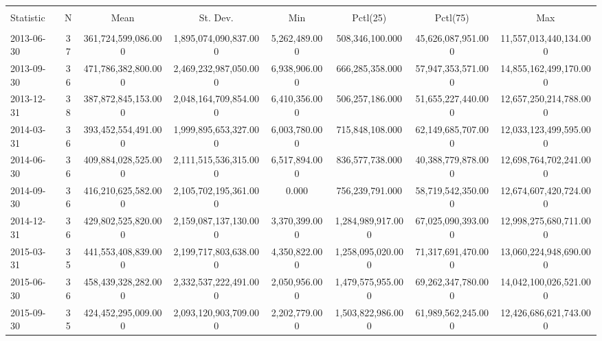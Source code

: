 \label{Appendix:Countycount}
\begin{table}[!htbp] \centering 
  \caption{} 
  \label{} 
\begin{tabular}{@{\extracolsep{5pt}}lccccccc} 
\\[-1.8ex]\hline 
\hline \\[-1.8ex] 
Statistic & \multicolumn{1}{c}{N} & \multicolumn{1}{c}{Mean} & \multicolumn{1}{c}{St. Dev.} & \multicolumn{1}{c}{Min} & \multicolumn{1}{c}{Pctl(25)} & \multicolumn{1}{c}{Pctl(75)} & \multicolumn{1}{c}{Max} \\ 
\hline \\[-1.8ex] 
2013-06-30 & 37 & 361,724,599,086.000 & 1,895,074,090,837.000 & 5,262,489.000 & 508,346,100.000 & 45,626,087,951.000 & 11,557,013,440,134.000 \\ 
2013-09-30 & 36 & 471,786,382,800.000 & 2,469,232,987,050.000 & 6,938,906.000 & 666,285,358.000 & 57,947,353,571.000 & 14,855,162,499,170.000 \\ 
2013-12-31 & 38 & 387,872,845,153.000 & 2,048,164,709,854.000 & 6,410,356.000 & 506,257,186.000 & 51,655,227,440.000 & 12,657,250,214,788.000 \\ 
2014-03-31 & 36 & 393,452,554,491.000 & 1,999,895,653,327.000 & 6,003,780.000 & 715,848,108.000 & 62,149,685,707.000 & 12,033,123,499,595.000 \\ 
2014-06-30 & 36 & 409,884,028,525.000 & 2,111,515,536,315.000 & 6,517,894.000 & 836,577,738.000 & 40,388,779,878.000 & 12,698,764,702,241.000 \\ 
2014-09-30 & 36 & 416,210,625,582.000 & 2,105,702,195,361.000 & 0.000 & 756,239,791.000 & 58,719,542,350.000 & 12,674,607,420,724.000 \\ 
2014-12-31 & 36 & 429,802,525,820.000 & 2,159,087,137,130.000 & 3,370,399.000 & 1,284,989,917.000 & 67,025,090,393.000 & 12,998,275,680,711.000 \\ 
2015-03-31 & 35 & 441,553,408,839.000 & 2,199,717,803,638.000 & 4,350,822.000 & 1,258,095,020.000 & 71,317,691,470.000 & 13,060,224,948,690.000 \\ 
2015-06-30 & 36 & 458,439,328,282.000 & 2,332,537,222,491.000 & 2,050,956.000 & 1,479,575,955.000 & 69,262,347,780.000 & 14,042,100,026,521.000 \\ 
2015-09-30 & 35 & 424,452,295,009.000 & 2,093,120,903,709.000 & 2,202,779.000 & 1,503,822,986.000 & 61,989,562,245.000 & 12,426,686,621,743.000 \\ 

\end{tabular}
\end{table}
